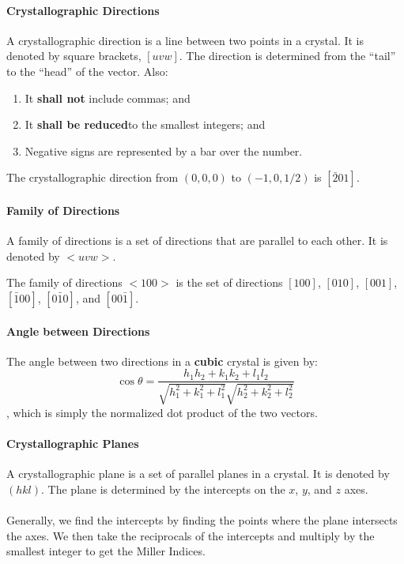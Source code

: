 \documentclass[11pt]{report}
\begin{document}
\paragraph{Crystallographic Directions} A crystallographic direction is a line between two points in a crystal. It is denoted by square brackets, $[uvw]$. The direction is determined from the ``tail'' to the ``head'' of the vector. Also:
\begin{enumerate}
    \item It \textbf{shall not} include commas; and
    \item It \textbf{shall be reduced}to the smallest integers; and
    \item Negative signs are represented by a bar over the number.
\end{enumerate}
\begin{example}
    The crystallographic direction from $(0,0,0)$ to $(-1,0,1/2)$ is $[\bar{2}01]$.
\end{example}
\paragraph{Family of Directions} A family of directions is a set of directions that are parallel to each other. It is denoted by $<uvw>$.
\begin{example}
    The family of directions $<100>$ is the set of directions $[100]$, $[010]$, $[001]$, $[\bar{1}00]$, $[0\bar{1}0]$, and $[00\bar{1}]$.
\end{example}
\paragraph{Angle between Directions} The angle between two directions in a \textbf{cubic} crystal is given by:
\begin{equation}
    \cos \theta = \frac{h_1h_2 + k_1k_2 + l_1l_2}{\sqrt{h_1^2 + k_1^2 + l_1^2}\sqrt{h_2^2 + k_2^2 + l_2^2}}
\end{equation}
, which is simply the normalized dot product of the two vectors.
\paragraph{Crystallographic Planes} A crystallographic plane is a set of parallel planes in a crystal. It is denoted by $(hkl)$. The plane is determined by the intercepts on the $x$, $y$, and $z$ axes. 
\paragraph{} Generally, we find the intercepts by finding the points where the plane intersects the axes. We then take the reciprocals of the intercepts and multiply by the smallest integer to get the Miller Indices.
\end{document}

